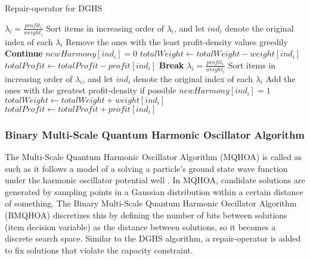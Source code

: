 \documentclass[titlepage]{article}
\begin{document}
\vskip 0.5cm
\begin{breakablealgorithm}
\caption{Repair-operator for DGHS}\label{harmonyRepair}
    \begin{algorithmic}[1]
             \Comment{\textcolor{blue}{DROP phase}}
                \State $\lambda_{i} = \frac{profit_{i}}{weight_{i}}$
            \EndFor
            \State Sort items in increasing order of $\lambda_{i}$, and let $ind_{i}$ denote the original index of each $\lambda_{i}$
            \State Remove the ones with the least profit-density values greedily
                    \State \textbf{Continue}
                \EndIf
                \State $newHarmony[ind_{i}] = 0$ \Comment{\textcolor{blue}{Unload the item}}
                \State $totalWeight \gets totalWeight - weight[ind_{i}]$
                \State $totalProfit \gets totalProfit - profit[ind_{i}]$
                    \State \textbf{Break} \Comment{\textcolor{blue}{Terminate DROP phase}}
                \EndIf
            \EndFor
        \EndIf
             \Comment{\textcolor{blue}{ADD phase}}
                \State $\lambda_{i} = \frac{profit_{i}}{weight_{i}}$
            \EndFor
            \State Sort items in increasing order of $\lambda_{i}$, and let $ind_{i}$ denote the original index of each $\lambda_{i}$
                \State Add the ones with the greatest profit-density if possible 
                        \State $newHarmony[ind_{i}] = 1$
                        \State $totalWeight \gets totalWeight + weight[ind_{i}]$
                        \State $totalProfit \gets totalProfit + profit[ind_{i}]$
                    \EndIf
                \EndIf
            \EndFor
        \EndIf
    \end{algorithmic}
\end{breakablealgorithm}

\vskip 1cm
\subsubsection{Binary Multi-Scale Quantum Harmonic Oscillator Algorithm}

The Multi-Scale Quantum Harmonic Oscillator Algorithm (MQHOA) is called as such as it follows a model of a solving a particle's ground state wave function under the harmonic oscillator potential well \cite{BMQHOA-article} . In MQHOA, candidate solutions are generated by sampling points in a Gaussian distribution within a certain distance of something. The Binary Multi-Scale Quantum Harmonic Oscillator Algorithm (BMQHOA) discretizes this by defining the number of bits between solutions (item decision variable) as the distance between solutions, so it becomes a discrete search space. Similar to the DGHS algorithm, a repair-operator is added to fix solutions that violate the capacity constraint. 
\end{document}
